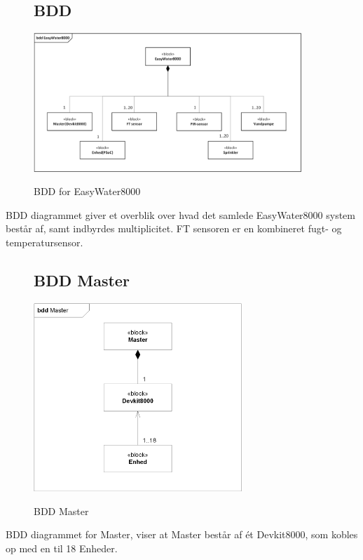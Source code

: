 \begin{figure}[H] \centering
\subsection{BDD}
{\includegraphics[width=0.9\textwidth]{filer/systemarkitektur/BDD}}
\caption{BDD for EasyWater8000}
\label{lab:bdd}
\raggedright
\end{figure}
BDD diagrammet giver et overblik over hvad det samlede EasyWater8000 system består af, samt indbyrdes multiplicitet. FT sensoren er en kombineret fugt- og temperatursensor.  \newline \newline

\begin{figure}[H] \centering
\subsection{BDD Master}
{\includegraphics[width=0.7\textwidth]{filer/systemarkitektur/BDD_Master}}
\caption{BDD Master}
\label{lab:bddmaster}
\raggedright
\end{figure}
BDD diagrammet for Master, viser at Master består af ét Devkit8000, som kobles op med en til 18 Enheder.

